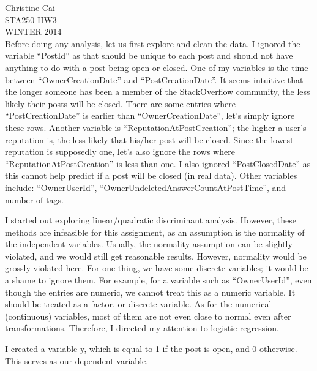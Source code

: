 \documentclass[12pt]{article}
\begin{document}
\noindent Christine Cai\\
STA250 HW3\\
WINTER 2014\\

Before doing any analysis, let us first explore and clean the data. I ignored the variable ``PostId'' as that should be unique to each post and should not have anything to do with a post being open or closed. One of my variables is the time between ``OwnerCreationDate'' and ``PostCreationDate''. It seems intuitive that the longer someone has been a member of the StackOverflow community, the less likely their posts will be closed. There are some entries where ``PostCreationDate'' is earlier than ``OwnerCreationDate'', let's simply ignore these rows. Another variable is ``ReputationAtPostCreation''; the higher a user's reputation is, the less likely that his/her post will be closed. Since the lowest reputation is supposedly one, let's also ignore the rows where ``ReputationAtPostCreation'' is less than one. I also ignored ``PostClosedDate'' as this cannot help predict if a post will be closed (in real data). Other variables include: ``OwnerUserId'', ``OwnerUndeletedAnswerCountAtPostTime'', and number of tags.

I started out exploring linear/quadratic discriminant analysis. However, these methods are infeasible for this assignment, as an assumption is the normality of the independent variables. Usually, the normality assumption can be slightly violated, and we would still get reasonable results. However, normality would be grossly violated here. For one thing, we have some discrete variables; it would be a shame to ignore them. For example, for a variable such as ``OwnerUserId'', even though the entries are numeric, we cannot treat this as a numeric variable. It should be treated as a factor, or discrete variable. As for the numerical (continuous) variables, most of them are not even close to normal even after transformations. Therefore, I directed my attention to logistic regression.

I created a variable y, which is equal to 1 if the post is open, and 0 otherwise. This serves as our dependent variable.
\end{document}
